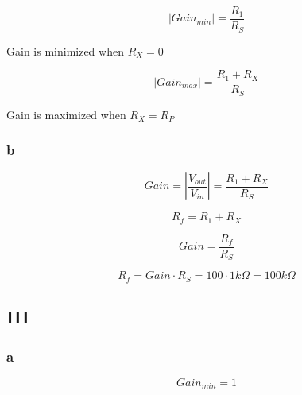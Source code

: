 \documentclass[10pt]{article}
\begin{document}
$$|Gain_{min}| = \frac{R_1}{R_S}$$

\begin{center}
Gain is minimized when $R_X = 0$
\end{center}

$$|Gain_{max}| = \frac{R_1+R_X}{R_S}$$

\begin{center}
\noindent Gain is maximized when $R_X = R_P$
\end{center}

\subsubsection*{b}
$$Gain = |\frac{V_{out}}{V_{in}}| = \frac{R_1+R_X}{R_S}$$

$$R_f = R_1 + R_X$$

$$Gain = \frac{R_f}{R_S}$$

$$R_f = Gain\cdot R_S = 100 \cdot 1k\Omega = 100k\Omega$$

\subsection*{III}
\subsubsection*{a}
$$Gain_{min} = 1$$
\end{document}
